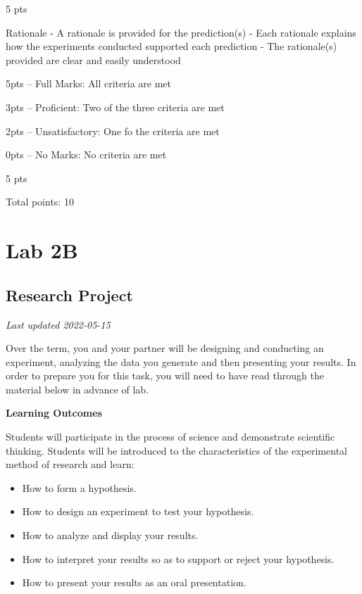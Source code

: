 \documentclass[
]{book}
\providecommand{\tightlist}{%
  \setlength{\itemsep}{0pt}\setlength{\parskip}{0pt}}
\begin{document}
5 pts

Rationale
- A rationale is provided for the prediction(s)
- Each rationale explains how the experiments conducted supported each prediction
- The rationale(s) provided are clear and easily understood

5pts -- Full Marks: All criteria are met

3pts -- Proficient: Two of the three criteria are met

2pts -- Unsatisfactory: One fo the criteria are met

0pts -- No Marks: No criteria are met

5 pts

Total points: 10

\hypertarget{part-lab-2b}{%
\part*{Lab 2B}\label{part-lab-2b}}

\hypertarget{research-project}{%
\chapter*{Research Project}\label{research-project}}

\emph{Last updated 2022-05-15}

Over the term, you and your partner will be designing and conducting an experiment, analyzing the data you generate and then presenting your results. In order to prepare you for this task, you will need to have read through the material below in advance of lab.

\textbf{Learning Outcomes}

Students will participate in the process of science and demonstrate scientific thinking. Students will be introduced to the characteristics of the experimental method of research and learn:

\begin{itemize}
\tightlist
\item
  How to form a hypothesis.
\item
  How to design an experiment to test your hypothesis.
\item
  How to analyze and display your results.
\item
  How to interpret your results so as to support or reject your hypothesis.
\item
  How to present your results as an oral presentation.
\end{itemize}
\end{document}
